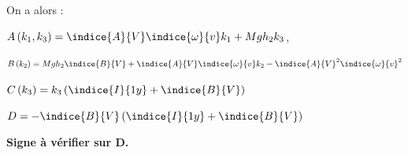 \begin{corrige}
On a alors :

$A\left(k_1,k_3\right)= \indice{A}{V}\indice{\omega}{v} k_1 + Mgh_2 k_3$,

$B\left(k_2\right) = Mgh_2 \indice{B}{V} + \indice{A}{V}\indice{\omega}{v} k_2 - \indice{A}{V}^2\indice{\omega}{v}^2$

$C\left(k_3\right) = k_3 \left(\indice{I}{1y} +\indice{B}{V} \right)$

$D = -  \indice{B}{V} \left(\indice{I}{1y} +\indice{B}{V} \right) $


\textbf{Signe à vérifier sur D.}

\end{corrige}
\else
\fi


 $
 $
 
 

%
%
%
%
%
%
%
%
%

